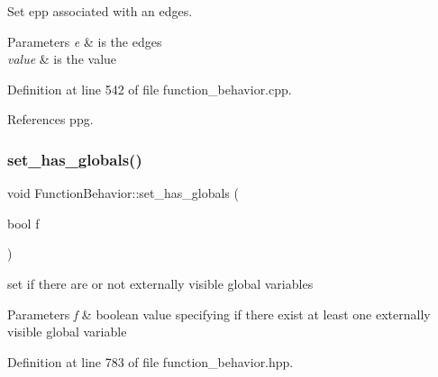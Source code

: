 Set epp associated with an edges. 


\begin{DoxyParams}{Parameters}
{\em e} & is the edges \\
\hline
{\em value} & is the value \\
\hline
\end{DoxyParams}


Definition at line 542 of file function\+\_\+behavior.\+cpp.



References ppg.

\mbox{\label{classFunctionBehavior_aea7648ee83cb16c05995ff50bf9fc2d0}} 
\subsubsection{\texorpdfstring{set\+\_\+has\+\_\+globals()}{set\_has\_globals()}}
{\footnotesize\ttfamily void Function\+Behavior\+::set\+\_\+has\+\_\+globals (\begin{DoxyParamCaption}\item[{bool}]{f }\end{DoxyParamCaption})\hspace{0.3cm}{\ttfamily [inline]}}



set if there are or not externally visible global variables 


\begin{DoxyParams}{Parameters}
{\em f} & boolean value specifying if there exist at least one externally visible global variable \\
\hline
\end{DoxyParams}


Definition at line 783 of file function\+\_\+behavior.\+hpp.

\mbox{\label{classFunctionBehavior_a87418281b2b236a5ea1a713c69562d3e}} 

